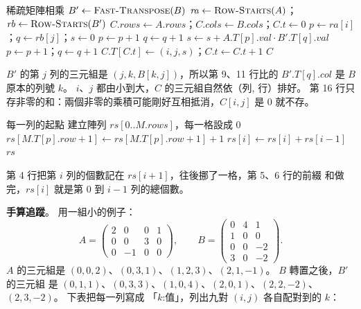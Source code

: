 \begin{pseudo}[label=alg:arr-sparse-mul, unbreakable]{稀疏矩陣相乘}
 
    \State $B' \gets \Call{Fast-Transpose}{B}$
    \State $\mathit{ra} \gets \Call{Row-Starts}{A}$；$\mathit{rb} \gets \Call{Row-Starts}{B'}$
    \State $C.\mathit{rows} \gets A.\mathit{rows}$；$C.\mathit{cols} \gets B.\mathit{cols}$；$C.t \gets 0$
            \State $p \gets \mathit{ra}[i]$；$q \gets \mathit{rb}[j]$；$s \gets 0$
                    \State $p \gets p + 1$
                    \State $q \gets q + 1$
                \Else
                    \State $s \gets s + A.T[p].\mathit{val} \cdot B'.T[q].\mathit{val}$
                    \State $p \gets p + 1$；$q \gets q + 1$
                \EndIf
            \EndWhile
                \State $C.T[C.t] \gets (i, j, s)$；$C.t \gets C.t + 1$
            \EndIf
        \EndFor
    \EndFor
    \State \Return $C$
\EndFunction
\end{pseudo}

$B'$ 的第 $j$ 列的三元組是 $(j, k, B[k, j])$，所以第 9、11 行比的 $B'.T[q].\mathit{col}$
是 $B$ 原本的列號 $k$。 $i$、$j$ 都由小到大，$C$ 的三元組自然依（列, 行）排好。 第
16 行只存非零的和：兩個非零的乘積可能剛好互相抵消，$C[i, j]$ 是 $0$ 就不存。

\begin{pseudo}[label=alg:arr-row-starts, unbreakable]{每一列的起點}
    \State 建立陣列 $\mathit{rs}[0..M.\mathit{rows}]$，每一格設成 $0$
        \State $\mathit{rs}[M.T[p].\mathit{row} + 1] \gets \mathit{rs}[M.T[p].\mathit{row} + 1] + 1$
    \EndFor
        \State $\mathit{rs}[i] \gets \mathit{rs}[i] + \mathit{rs}[i - 1]$
    \EndFor
    \State \Return $\mathit{rs}$
\EndFunction
\end{pseudo}

第 4 行把第 $i$ 列的個數記在 $\mathit{rs}[i + 1]$，往後挪了一格，第 5、6 行的前綴
和做完，$\mathit{rs}[i]$ 就是第 $0$ 到 $i - 1$ 列的總個數。

\textbf{手算追蹤}。 用一組小的例子：
\[
A = \begin{pmatrix} 2 & 0 & 0 & 1 \\ 0 & 0 & 3 & 0 \\ 0 & -1 & 0 & 0 \end{pmatrix},
\qquad
B = \begin{pmatrix} 0 & 4 & 1 \\ 1 & 0 & 0 \\ 0 & 0 & -2 \\ 3 & 0 & -2 \end{pmatrix}.
\]
$A$ 的三元組是 $(0,0,2)$、$(0,3,1)$、$(1,2,3)$、$(2,1,-1)$。 $B$ 轉置之後，$B'$ 的三元組
是 $(0,1,1)$、$(0,3,3)$、$(1,0,4)$、$(2,0,1)$、$(2,2,-2)$、$(2,3,-2)$。 下表把每一列寫成
「$k$:值」，列出九對 $(i, j)$ 各自配對到的 $k$：

